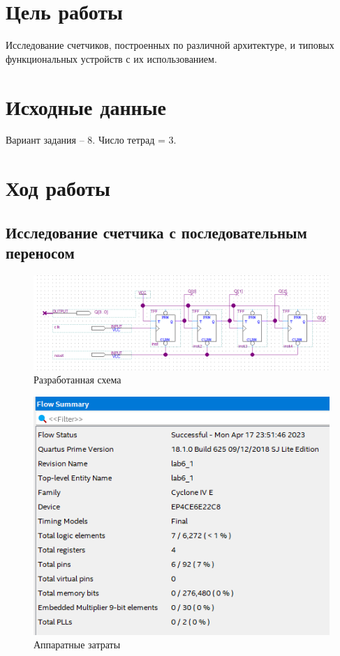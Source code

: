 \documentclass[a4paper,12pt]{article}
\begin{document}
    

    \tableofcontents

    \section{Цель работы}
    Исследование счетчиков, построенных по различной архитектуре, и типовых функциональных устройств с их использованием.
    \section{Исходные данные}
    Вариант задания -- 8. Число тетрад = 3.
    \section{Ход работы}
    \subsection{Исследование счетчика с последовательным переносом}
    \begin{figure}[H]
        \centering
        \includegraphics[width=0.9\linewidth]{scheme1}
        \caption{Разработанная схема}
    \end{figure}

    \begin{figure}[H]
        \centering
        \includegraphics[width=0.6\linewidth]{compile1}
        \caption{Аппаратные затраты}
    \end{figure}
\end{document}
